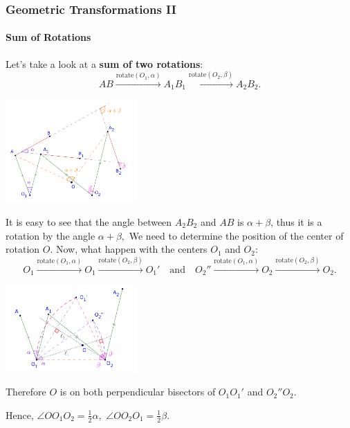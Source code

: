 \documentclass[8pt,xcolor=table,dvipsnames]{beamer}
\providecommand{\half}{\frac{1}{2}}
\begin{document}
\begin{frame}[t]
    \frametitle{Geometric Transformations II}
    \framesubtitle{Sum of Rotations}
    \begin{overprint}
        Let's take a look at a \textbf{sum of two rotations}:
        \[
            AB \stackrel{\text{rotate}(O_1, \alpha)}{\rightarrow} A_1B_1 \stackrel{\text{rotate}(O_2, \beta)}{\rightarrow} A_2B_2.
        \]
        \begin{center}
            \includegraphics[width=5cm]{./svg/pdf/sum-rotations-1.pdf}
        \end{center}

        It is easy to see that the angle between $A_2B_2$ and $AB$ is $\alpha + \beta$, thus it is a rotation by the angle $\alpha + \beta,$
        We need to determine the position of the center of rotation $O$.
        Now, what happen with the centers $O_1$ and $O_2$:
        \[
            O_1 \stackrel{\text{rotate}(O_1, \alpha)}{\rightarrow} O_1 \stackrel{\text{rotate}(O_2, \beta)}{\rightarrow} O_1'
            \quad \text{and} \quad O_2'' \stackrel{\text{rotate}(O_1, \alpha)}{\rightarrow} O_2 \stackrel{\text{rotate}(O_2, \beta)}{\rightarrow} O_2.
        \]
        \begin{center}
            \includegraphics[width=5cm]{./svg/pdf/sum-rotations-2.pdf}
        \end{center}
        Therefore $O$ is on both perpendicular bisectors of $O_1O_1'$ and $O_2''O_2$.

        \bigbreak        
        Hence, $\angle OO_1O_2 = \half \alpha,$  $\angle OO_2O_1 = \half \beta.$
    \end{overprint}
\end{frame}
\end{document}
